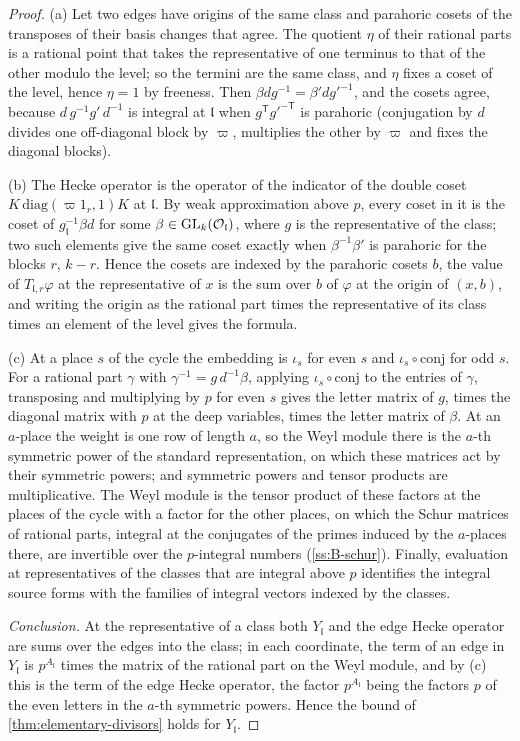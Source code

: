 \begin{proof}
(a) Let two edges have origins of the same class and parahoric cosets of the transposes of their basis changes that agree. The quotient $\eta$ of their rational parts is a rational point that takes the representative of one terminus to that of the other modulo the level; so the termini are the same class, and $\eta$ fixes a coset of the level, hence $\eta=1$ by
freeness. Then $\beta d g^{-1}=\beta'dg'^{-1}$, and the cosets agree, because $d\,g^{-1}g'\,d^{-1}$ is integral at $\mathfrak l$ when $g^{\mathsf T}g'^{-\mathsf T}$ is parahoric (conjugation by $d$ divides one off-diagonal block by $\varpi$, multiplies the other by $\varpi$ and fixes the diagonal blocks).

(b) The Hecke operator is the operator of the indicator of the double coset $K\,\mathrm{diag}(\varpi1_r,1)K$ at $\mathfrak l$. By weak approximation above $p$, every coset in it is the coset of $g_{\mathfrak l}^{-1}\beta d$ for some $\beta\in\operatorname{GL}_k(\mathcal{O}_{\mathfrak l})$, where $g$ is the representative of the class; two such elements give the same coset exactly when $\beta^{-1}\beta'$ is parahoric for
the blocks $r$, $k-r$. Hence the cosets are indexed by the parahoric cosets $b$, the value of $T_{\mathfrak l,r}\varphi$ at the representative of $x$ is the sum over $b$ of $\varphi$ at the origin of $(x,b)$, and writing the origin as the rational part times the representative of its class times an element of the level gives the formula.

(c) At a place $s$ of the cycle the embedding is $\iota_s$ for even $s$ and $\iota_s\circ\mathrm{conj}$ for odd $s$. For a rational part $\gamma$ with $\gamma^{-1}=g\,d^{-1}\beta$, applying $\iota_s\circ\mathrm{conj}$ to the entries of $\gamma$, transposing and multiplying by $p$ for even $s$ gives the letter matrix of $g$, times the diagonal matrix with $p$ at the deep variables, times the letter matrix of $\beta$.
At an $a$-place the weight is one row of length $a$, so the Weyl module there is the $a$-th symmetric power of the standard representation, on which these matrices act by their symmetric powers; and symmetric powers and tensor products are multiplicative. The Weyl module is the tensor product of these factors at the places of the cycle with a factor for the other
places, on which the Schur matrices of rational parts, integral at the conjugates of the primes induced by the $a$-places there, are invertible over the $p$-integral numbers (\cref{ss:B-schur}). Finally, evaluation at representatives of the classes that are integral above $p$ identifies the integral source forms with the families of integral vectors indexed by
the classes.

\emph{Conclusion.} At the representative of a class both $Y_{\mathfrak l}$ and the edge Hecke operator are sums over the edges into the class; in each coordinate, the term of an edge in $Y_{\mathfrak l}$ is $p^{A_{\mathfrak l}}$ times the matrix of the rational part on the Weyl module, and by (c) this is the term of the edge Hecke operator, the factor $p^{A_{\mathfrak l}}$ being the factors
$p$ of the even letters in the $a$-th symmetric powers. Hence the bound of \cref{thm:elementary-divisors} holds for $Y_{\mathfrak l}$.
\end{proof}

